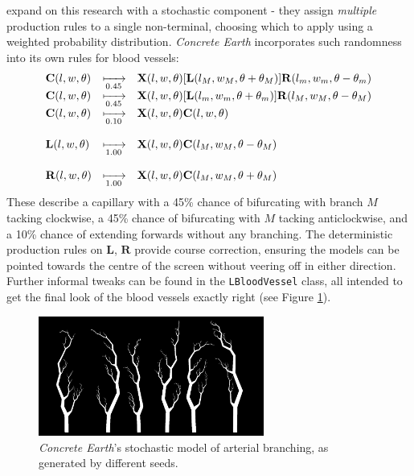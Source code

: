 \documentclass[a4paper, 11pt]{article}
\begin{document}
\begin{flushleft}
\vspace{5pt}\noindent
\citet{liuSimulationBloodVessels} expand on this research with a stochastic component - they assign \textit{multiple} production rules to a single non-terminal, choosing which to apply using a weighted probability distribution. \textit{Concrete Earth} incorporates such randomness into its own rules for blood vessels:
$$\begin{matrix*}[l]
\mathbf{C}(l,w,\theta) &\xmapsto[0.45]{} &\mathbf{X}(l,w,\theta)[\mathbf{L}(l_M,w_M,\theta+\theta_M)]\mathbf{R}(l_m,w_m,\theta-\theta_m) \\
\mathbf{C}(l,w,\theta) &\xmapsto[0.45]{} &\mathbf{X}(l,w,\theta)[\mathbf{L}(l_m,w_m,\theta+\theta_m)]\mathbf{R}(l_M,w_M,\theta-\theta_M) \\
\mathbf{C}(l,w,\theta) &\xmapsto[0.10]{} &\mathbf{X}(l,w,\theta)\mathbf{C}(l,w,\theta) \\
& & \\
\mathbf{L}(l,w,\theta) &\xmapsto[1.00]{} &\mathbf{X}(l,w,\theta)\mathbf{C}(l_M,w_M,\theta-\theta_M) \\
& & \\
\mathbf{R}(l,w,\theta) &\xmapsto[1.00]{} &\mathbf{X}(l,w,\theta)\mathbf{C}(l_M,w_M,\theta+\theta_M)
\end{matrix*}$$
These describe a capillary with a 45\% chance of bifurcating with branch $M$ tacking clockwise, a 45\% chance of bifurcating with $M$ tacking anticlockwise, and a 10\% chance of extending forwards without any branching. The deterministic production rules on $\mathbf{L}$, $\mathbf{R}$ provide course correction, ensuring the models can be pointed towards the centre of the screen without veering off in either direction. Further informal tweaks can be found in the \texttt{LBloodVessel} class, all intended to get the final look of the blood vessels exactly right (see Figure \ref{Blood Vessels}). 

\vspace{5pt}\noindent
\begin{figure}[h]
\centering
\includegraphics[width=0.66\textwidth]{Blood Vessels}
\caption{\textit{Concrete Earth}'s stochastic model of arterial branching, as generated by different seeds.}
\label{Blood Vessels}
\end{figure}



\end{flushleft}
\end{document}
